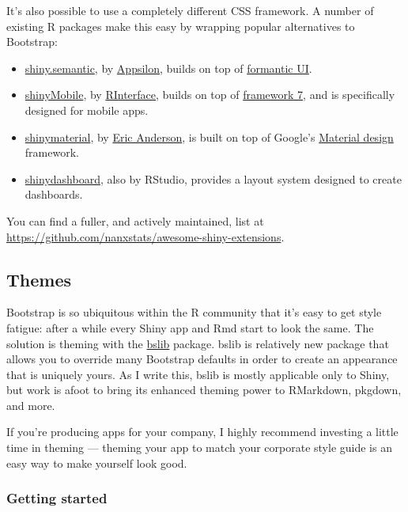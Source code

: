 \documentclass[
]{article}
\begin{document}
It's also possible to use a completely different CSS framework.
A number of existing R packages make this easy by wrapping popular alternatives to Bootstrap:

\begin{itemize}
\item
  \href{https://appsilon.github.io/shiny.semantic/}{shiny.semantic}, by \href{https://appsilon.com/}{Appsilon}, builds on top of \href{https://fomantic-ui.com}{formantic UI}.
\item
  \href{https://github.com/RinteRface/shinyMobile}{shinyMobile}, by \href{https://rinterface.com}{RInterface}, builds on top of \href{https://framework7.io}{framework 7}, and is specifically designed for mobile apps.
\item
  \href{https://ericrayanderson.github.io/shinymaterial/}{shinymaterial}, by \href{https://github.com/ericrayanderson}{Eric Anderson}, is built on top of Google's \href{https://material.io/design}{Material design} framework.
\item
  \href{https://rstudio.github.io/shinydashboard/}{shinydashboard}, also by RStudio, provides a layout system designed to create dashboards.
\end{itemize}

You can find a fuller, and actively maintained, list at \url{https://github.com/nanxstats/awesome-shiny-extensions}.

\hypertarget{themes}{%
\subsection{Themes}\label{themes}}

Bootstrap is so ubiquitous within the R community that it's easy to get style fatigue: after a while every Shiny app and Rmd start to look the same.
The solution is theming with the \href{https://rstudio.github.io/bslib}{bslib} package.
bslib is relatively new package that allows you to override many Bootstrap defaults in order to create an appearance that is uniquely yours.
As I write this, bslib is mostly applicable only to Shiny, but work is afoot to bring its enhanced theming power to RMarkdown, pkgdown, and more.

If you're producing apps for your company, I highly recommend investing a little time in theming --- theming your app to match your corporate style guide is an easy way to make yourself look good.

\hypertarget{getting-started}{%
\subsubsection{Getting started}\label{getting-started}}
\end{document}
